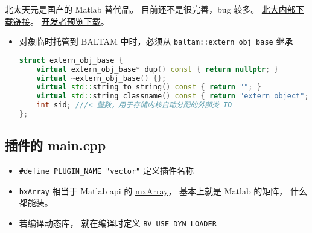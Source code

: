 
\begin{issues}
\issueDraft
\end{issues}

北太天元是国产的 Matlab 替代品。 目前还不是很完善，bug 较多。 \href{https://disk.pku.edu.cn/#/link/0EE816030B2E1A296FB029890388CD02?gns=41CD4566C310478980471F9C52E8C51B\%252F5B93BC04B04148DAA3CA90083970528B\%252FE869B8A40C754CE4B4033134D7DE6E22}{北大内部下载链接}。 \href{https://www.baltamatica.com/community/sposts/detail/21af2f4f-9e66-5f90-453f-b3cf26ab3833.html}{开发者预览下载}。

\begin{itemize}
\item 对象临时托管到 BALTAM 中时，必须从 \verb|baltam::extern_obj_base| 继承
\begin{lstlisting}[language=cpp, caption=extern\_obj.h节选]
struct extern_obj_base {
    virtual extern_obj_base* dup() const { return nullptr; }
    virtual ~extern_obj_base() {};
    virtual std::string to_string() const { return ""; }
    virtual std::string classname() const { return "extern object"; };
    int sid; ///< 整数，用于存储内核自动分配的外部类 ID
};
\end{lstlisting}
\end{itemize}

\subsection{插件的 main.cpp}
\begin{itemize}
\item \verb|#define PLUGIN_NAME "vector"| 定义插件名称
\item \verb|bxArray| 相当于 Matlab api 的 \href{https://www.mathworks.com/help/matlab/apiref/mxarray.html}{mxArray}， 基本上就是 Matlab 的矩阵， 什么都能装。
\item 若编译动态库， 就在编译时定义 \verb|BV_USE_DYN_LOADER|
\end{itemize}

